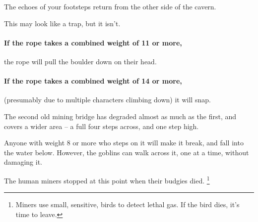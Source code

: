 \begin{multicols}{2}
\begin{boxtext}
  The echoes of your footsteps return from the other side of the cavern.
\end{boxtext}

This may look like a trap, but it isn't.


\paragraph{If the rope takes a combined \gls{weight} of 11 or more,}
the rope will pull the boulder down on their head.

\paragraph{If the rope takes a combined \gls{weight} of 14 or more,}
(presumably due to multiple characters climbing down) it will snap.




\begin{exampletext}
  The second old mining bridge has degraded almost as much as the first, and covers a wider area -- a full four \glspl{step} across, and one \gls{step} high.
\end{exampletext}

Anyone with \gls{weight} 8 or more who steps on it will make it break, and fall into the water below.
However, the goblins can walk across it, one at a time, without damaging it.





\begin{exampletext}
  The human miners stopped at this point when their budgies died.%
  \footnote{Miners use small, sensitive, birds to detect lethal gas.  If the bird dies, it's time to leave.}


\end{exampletext}
\end{multicols}
